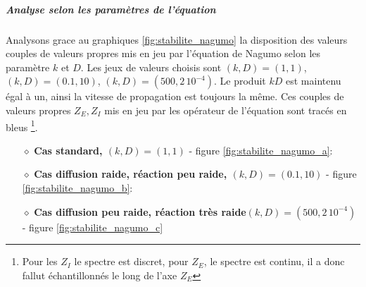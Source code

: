             \subparagraph{Analyse selon les paramètres de l'équation}
            Analysons grace au graphiques \ref{fig:stabilite_nagumo} la disposition des valeurs couples de valeurs 
            propres mis en jeu par l'équation de Nagumo selon les paramètre $k$ et $D$.
            Les jeux de valeurs choisis sont $(k,D)=(1,1)$, $(k,D)=(0.1,10)$, $(k,D)=(500,2\, 10^{-4})$. 
            Le produit $kD$ est maintenu égal à un, ainsi la vitesse de propagation est toujours la même.
            Ces couples de valeurs propres $Z_E,Z_I$ mis en jeu par les opérateur de l'équation sont tracés en bleus
            \footnote{Pour les $Z_I$ le spectre est discret, pour $Z_E$, le spectre est continu, il a donc fallut échantillonnés le long de l'axe $Z_E$}.
            \begin{itemize}
                \item[$\diamond$]\textbf{Cas standard, $(k,D)=(1,1)$} - figure \ref{fig:stabilite_nagumo_a}:\\
                    
                \item[$\diamond$]\textbf{Cas diffusion raide, réaction peu raide, $(k,D)=(0.1,10)$}  - figure \ref{fig:stabilite_nagumo_b}:\\
                \item[$\diamond$]\textbf{Cas diffusion peu raide, réaction très raide$(k,D)=(500,2\, 10^{-4})$} - figure \ref{fig:stabilite_nagumo_c}\\
            \end{itemize}
